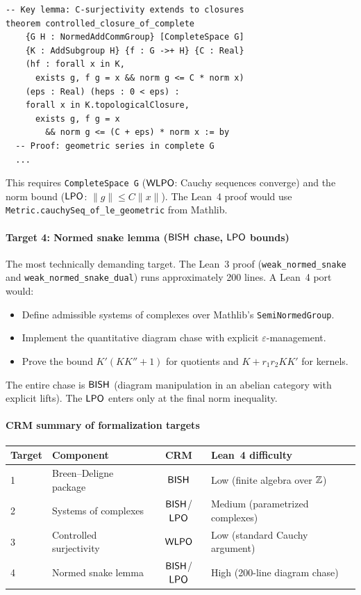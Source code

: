 \begin{verbatim}
-- Key lemma: C-surjectivity extends to closures
theorem controlled_closure_of_complete
    {G H : NormedAddCommGroup} [CompleteSpace G]
    {K : AddSubgroup H} {f : G ->+ H} {C : Real}
    (hf : forall x in K,
      exists g, f g = x && norm g <= C * norm x)
    (eps : Real) (heps : 0 < eps) :
    forall x in K.topologicalClosure,
      exists g, f g = x
        && norm g <= (C + eps) * norm x := by
  -- Proof: geometric series in complete G
  ...
\end{verbatim}

This requires \texttt{CompleteSpace G} ($\textsf{WLPO}$: Cauchy sequences
converge) and the norm bound ($\textsf{LPO}$: $\|g\| \leq C\|x\|$).
The Lean~4 proof would use \texttt{Metric.cauchySeq\_of\_le\_geometric}
from Mathlib.

\paragraph{Target 4: Normed snake lemma ($\textsf{BISH}$ chase, $\textsf{LPO}$ bounds)}

The most technically demanding target.  The Lean~3 proof
(\texttt{weak\_normed\_snake} and \texttt{weak\_normed\_snake\_dual})
runs approximately 200 lines.  A Lean~4 port would:
\begin{itemize}[nosep]
\item Define admissible systems of complexes over Mathlib's
  \texttt{SemiNormedGroup}.
\item Implement the quantitative diagram chase with explicit
  $\varepsilon$-management.
\item Prove the bound $K'(KK''+1)$ for quotients and
  $K + r_1 r_2 K K'$ for kernels.
\end{itemize}

The entire chase is $\textsf{BISH}$ (diagram manipulation in an abelian
category with explicit lifts).  The $\textsf{LPO}$ enters only at the
final norm inequality.

\paragraph{CRM summary of formalization targets}

\begin{center}
\begin{tabular}{llcl}
\toprule
\textbf{Target} & \textbf{Component} & \textbf{CRM} & \textbf{Lean~4 difficulty} \\
\midrule
1 & Breen--Deligne package  & $\textsf{BISH}$ & Low (finite algebra over $\mathbb{Z}$) \\
2 & Systems of complexes    & $\textsf{BISH}$/$\textsf{LPO}$ & Medium (parametrized complexes) \\
3 & Controlled surjectivity & $\textsf{WLPO}$ & Low (standard Cauchy argument) \\
4 & Normed snake lemma      & $\textsf{BISH}$/$\textsf{LPO}$ & High (200-line diagram chase) \\
\bottomrule
\end{tabular}
\end{center}

